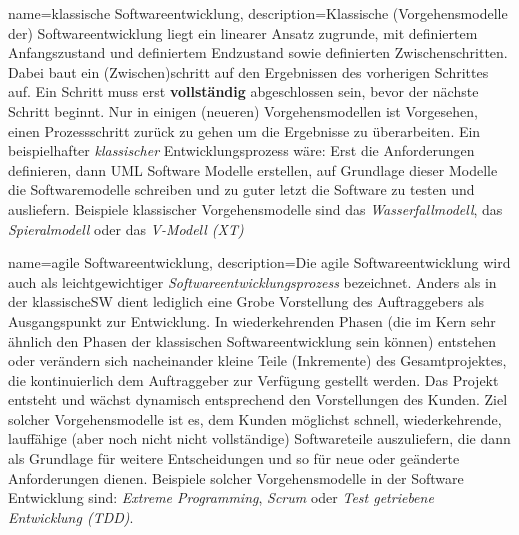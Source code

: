 
{
        name=klassische Softwareentwicklung,
        description={Klassische (Vorgehensmodelle der) Softwareentwicklung liegt
                ein linearer Ansatz zugrunde, mit definiertem Anfangszustand und
                definiertem Endzustand sowie definierten Zwischenschritten. Dabei
                baut ein (Zwischen)schritt auf den Ergebnissen des vorherigen
                Schrittes auf. Ein Schritt muss erst  \textbf{vollständig}
                abgeschlossen sein, bevor der nächste Schritt beginnt.
                Nur in einigen (neueren) Vorgehensmodellen ist Vorgesehen, einen
                Prozessschritt zurück zu gehen um die Ergebnisse zu
                überarbeiten. Ein beispielhafter \textit{klassischer}
                        Entwicklungsprozess wäre: Erst die Anforderungen
                        definieren, dann UML Software Modelle erstellen,
                        auf Grundlage dieser Modelle die Softwaremodelle
                        schreiben und zu guter letzt die Software zu
                        testen und ausliefern.
                        Beispiele
                        klassischer Vorgehensmodelle sind das
                        \textit{Wasserfallmodell}, das
                \textit{Spieralmodell} oder das \textit{V-Modell (XT)} }
}

{
        name=agile Softwareentwicklung,
        description={Die agile Softwareentwicklung wird auch als
                leichtgewichtiger \textit{Softwareentwicklungsprozess}
                bezeichnet. Anders als in der \gls{klassischeSW} dient
                lediglich eine Grobe Vorstellung des Auftraggebers als
                Ausgangspunkt zur Entwicklung. In wiederkehrenden Phasen
                (die im Kern sehr ähnlich den Phasen der klassischen
                Softwareentwicklung sein können) entstehen oder verändern sich nacheinander
                kleine Teile (Inkremente) des Gesamtprojektes, die kontinuierlich dem
                Auftraggeber zur Verfügung gestellt werden. Das Projekt
                entsteht und wächst dynamisch entsprechend den Vorstellungen des
                Kunden. Ziel solcher Vorgehensmodelle ist es, dem Kunden
                möglichst schnell, wiederkehrende, lauffähige (aber noch nicht
                nicht vollständige) Softwareteile auszuliefern, die dann als
                Grundlage für weitere Entscheidungen und so für neue oder
                geänderte Anforderungen dienen.
                Beispiele solcher Vorgehensmodelle in der Software Entwicklung
                sind: \textit{Extreme Programming}, \textit{Scrum} oder
        \textit{Test getriebene Entwicklung (TDD)}.}
}


